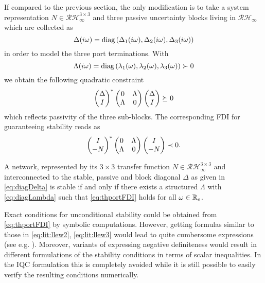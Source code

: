 If compared to the previous section, the only modification is to take a system 
representation $N\in\mathcal{RH}_\infty^{3\times 3}$ and three passive uncertainty 
blocks living in $\mathcal{RH}_\infty$ which are collected as
\begin{equation}
\Delta(i\omega) = \text{diag} \left( \Delta_1(i\omega),\Delta_2(i\omega),\Delta_3(i\omega)\right)
\label{eq:diagDelta}
\end{equation}
in order to model the three port terminations. With
\begin{equation}
\Lambda(i\omega) = \text{diag}\left( \lambda_1(\omega),\lambda_2(\omega),\lambda_3(\omega)\right)\succ 0
\label{eq:diagLambda}
\end{equation}
we obtain the following quadratic constraint
\[
\begin{pmatrix}\Delta\\I\end{pmatrix}^*\begin{pmatrix}0 &\Lambda\\\Lambda &0\end{pmatrix}\begin{pmatrix}\Delta\\I\end{pmatrix}\succeq 0
\]
which reflects passivity of the three sub-blocks. The corresponding FDI for guaranteeing stability reads as
\begin{equation}
\begin{pmatrix}I \\ -N\end{pmatrix}^*
\begin{pmatrix}0 &\Lambda\\\Lambda &0\end{pmatrix}
\begin{pmatrix}I \\ -N\end{pmatrix} \prec 0.
\label{eq:thportFDI}
\end{equation}
\begin{thm}\label{thm:3portll}

A network, represented by its $3\times3$ transfer function $N \in \mathcal{RH}_\infty^{3\times 3}$ 
and in\-ter\-connected to the {stable}, passive and block diagonal $\Delta$ as given in 
\eqref{eq:diagDelta} is stable if and only if there exists a structured $\Lambda$ with 
\eqref{eq:diagLambda} such that \eqref{eq:thportFDI} holds for all $\omega\in\mathbb{R}_e$.
\end{thm}

Exact conditions for unconditional stability could be obtained  from \eqref{eq:thportFDI} 
by symbolic computations. However, getting formulas similar to {those in} \eqref{eq:lit:llew2}, 
\eqref{eq:lit:llew3} would lead to quite cumbersome expressions (see e.g. \cite{kuochu, tan, 
khademian}). Moreover, variants of expressing negative definiteness would result in different 
formulations of the stability conditions in terms of scalar inequalities. In the IQC formulation 
this is completely avoided while it is still possible to easily verify the resulting conditions 
numerically.


